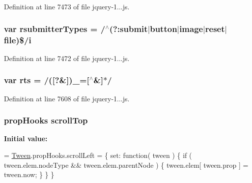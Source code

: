 Definition at line 7473 of file jquery-\/1...\+js.

\subsubsection[{\texorpdfstring{rsubmitter\+Types}{rsubmitterTypes}}]{\setlength{\rightskip}{0pt plus 5cm}var rsubmitter\+Types = /$^\wedge$(?\+:submit$\vert${\bf button}$\vert$image$\vert$reset$\vert$file)\$/{\bf i}}\hypertarget{_scripts_2jquery-1_810_82_8js_a0e9cd4ca08945afe827846f34a36c74a}{}\label{_scripts_2jquery-1_810_82_8js_a0e9cd4ca08945afe827846f34a36c74a}


Definition at line 7472 of file jquery-\/1...\+js.

\subsubsection[{\texorpdfstring{rts}{rts}}]{\setlength{\rightskip}{0pt plus 5cm}var rts = /(\mbox{[}?\&\mbox{]})\+\_\+=\mbox{[}$^\wedge$\&\mbox{]}$\ast$/}\hypertarget{_scripts_2jquery-1_810_82_8js_a38ff30904f54277281a13514d7aea00d}{}\label{_scripts_2jquery-1_810_82_8js_a38ff30904f54277281a13514d7aea00d}


Definition at line 7608 of file jquery-\/1...\+js.

\subsubsection[{\texorpdfstring{scroll\+Top}{scrollTop}}]{ {\bf prop\+Hooks} scroll\+Top}\hypertarget{_scripts_2jquery-1_810_82_8js_a57beb1f611d6c8b84919b0f7d9e0e890}{}\label{_scripts_2jquery-1_810_82_8js_a57beb1f611d6c8b84919b0f7d9e0e890}
{\bfseries Initial value\+:}
\begin{DoxyCode}
= \hyperlink{obj_2_release_2_package_2_package_tmp_2_scripts_2jquery-1_810_82_8js_a91e55267cc469e865a6a7c6cfc51c7b1}{Tween}.propHooks.scrollLeft = \{
    \textcolor{keyword}{set}: \textcolor{keyword}{function}( tween ) \{
        \textcolor{keywordflow}{if} ( tween.elem.nodeType && tween.elem.parentNode ) \{
            tween.elem[ tween.prop ] = tween.now;
        \}
    \}
\}
\end{DoxyCode}



